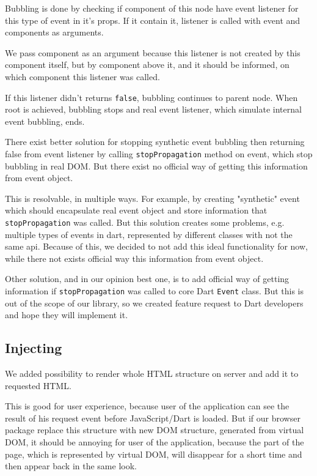 \documentclass[oneside, 12pt]{book}
\begin{document}
      Bubbling is done by checking if component of this node have event listener for this type of event in it's props.
      If it contain it, listener is called with event and components as arguments. 

      We pass component as an argument because this listener is not created by this component itself, 
      but by component above it, and it should be informed, on which component this listener was called.

      If this listener didn't returns \texttt{false}, bubbling continues to parent node. 
      When root is achieved, bubbling stops and real event listener, 
      which simulate internal event bubbling, ends.

      There exist better solution for stopping synthetic event bubbling then returning false from event listener 
      by calling \texttt{stopPropagation} method on event, which stop bubbling in real DOM. 
      But there exist no official way of getting this information from event object. 

      This is resolvable, in multiple ways. For example, by creating "synthetic" event
      which should encapsulate real event object and store information that \texttt{stopPropagation} was called.
      But this solution creates some problems, e.g. multiple types of events in dart, 
      represented by different classes with not the same api.
      Because of this, we decided to not add this ideal functionality for now, while there not exists official way this information from event object.

      Other solution, and in our opinion best one, 
      is to add official way of getting information if \texttt{stopPropagation} was called to core Dart \texttt{Event} class.
      But this is out of the scope of our library, so we created feature request to Dart developers and hope they will implement it.

  \subsection{Injecting}\label{subsec:our-architecture-injecting}

    We added possibility to render whole HTML structure on server and add it to requested HTML.

    This is good for user experience, because user of the application can see the result of his request event before JavaScript/Dart is loaded.
    But if our browser package replace this structure with new DOM structure, 
    generated from virtual DOM, it should be annoying for user of the application, because the part of the page, 
    which is represented by virtual DOM, will disappear for a short time and then appear back in the same look. 
\end{document}
